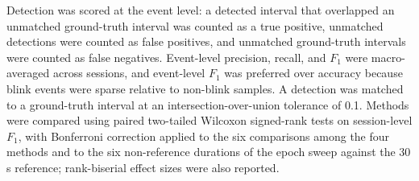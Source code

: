 Detection was scored at the event level: a detected interval that overlapped an unmatched ground-truth interval was counted as a true positive, unmatched detections were counted as false positives, and unmatched ground-truth intervals were counted as false negatives. Event-level precision, recall, and $F_1$ were macro-averaged across sessions, and event-level $F_1$ was preferred over accuracy because blink events were sparse relative to non-blink samples. A detection was matched to a ground-truth interval at an intersection-over-union tolerance of 0.1. Methods were compared using paired two-tailed Wilcoxon signed-rank tests on session-level $F_1$, with Bonferroni correction applied to the six comparisons among the four methods and to the six non-reference durations of the epoch sweep against the 30 s reference; rank-biserial effect sizes were also reported.
